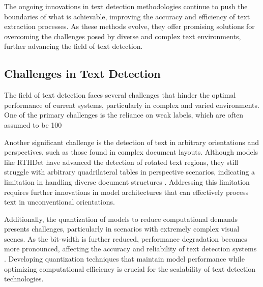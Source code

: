 The ongoing innovations in text detection methodologies continue to push the boundaries of what is achievable, improving the accuracy and efficiency of text extraction processes. As these methods evolve, they offer promising solutions for overcoming the challenges posed by diverse and complex text environments, further advancing the field of text detection.



\subsection{Challenges in Text Detection} \label{subsec:Challenges in Text Detection}



The field of text detection faces several challenges that hinder the optimal performance of current systems, particularly in complex and varied environments. One of the primary challenges is the reliance on weak labels, which are often assumed to be 100%



Another significant challenge is the detection of text in arbitrary orientations and perspectives, such as those found in complex document layouts. Although models like RTHDet have advanced the detection of rotated text regions, they still struggle with arbitrary quadrilateral tables in perspective scenarios, indicating a limitation in handling diverse document structures \cite{hu2023rthdetrotatetablearea}. Addressing this limitation requires further innovations in model architectures that can effectively process text in unconventional orientations.



Additionally, the quantization of models to reduce computational demands presents challenges, particularly in scenarios with extremely complex visual scenes. As the bit-width is further reduced, performance degradation becomes more pronounced, affecting the accuracy and reliability of text detection systems \cite{yin2017quantizationtraininglowbitwidth}. Developing quantization techniques that maintain model performance while optimizing computational efficiency is crucial for the scalability of text detection technologies.




